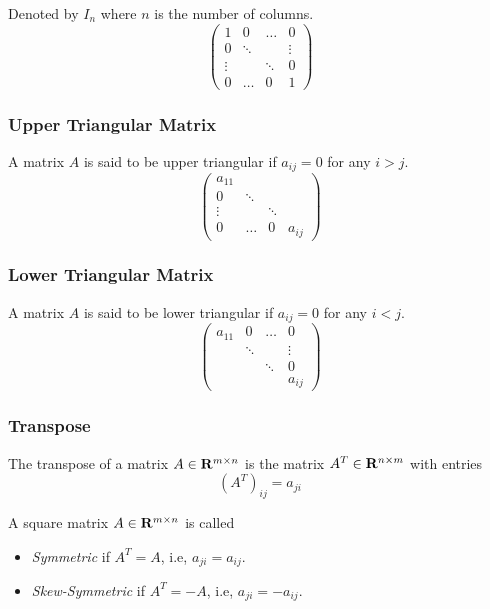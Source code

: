 \documentclass{article}
\begin{document}
	Denoted by $ I_n $ where $ n $ is the number of columns.
	\[
		\begin{pmatrix}
			1      & 0      & \dots  & 0      \\
			0      & \ddots &        & \vdots \\
			\vdots &        & \ddots & 0      \\
			0      & \dots  & 0      & 1
		\end{pmatrix}
	\]
	
	\subsubsection*{Upper Triangular Matrix}
	
	A matrix $ A $ is said to be upper triangular if $ a_{ij} = 0 $ for any $ i>j $.
	\[
		\begin{pmatrix}
			a_{11} &        &        &        \\
			0      & \ddots &        &        \\
			\vdots &        & \ddots &        \\
			0      & \dots  & 0      & a_{ij}
		\end{pmatrix}
	\]
	
	\subsubsection*{Lower Triangular Matrix}
	
	A matrix $ A $ is said to be lower triangular if $ a_{ij} = 0 $ for any $ i<j $.
	\[
		\begin{pmatrix}
			a_{11} & 0      & \dots  & 0      \\
			       & \ddots &        & \vdots \\
			       &        & \ddots & 0      \\
			       &        &        & a_{ij}
		\end{pmatrix}
	\]
	
	\subsubsection*{Transpose}
	
	The transpose of a matrix $ A \in \mathbf{R}^{m \times n} $ is the matrix $ A^T \in \mathbf{R}^{n \times m} $ with entries
	\[
		(A^T)_{ij} = a_{ji}
	\]
	
	A square matrix $ A \in \mathbf{R}^{m \times n} $ is called
	\begin{itemize}
		\item \textit{Symmetric} if $ A^T = A $, i.e, $ a_{ji} = a_{ij} $.
		\item \textit{Skew-Symmetric} if $ A^T = -A $, i.e, $ a_{ji} = -a_{ij} $.
	\end{itemize}
	
\end{document}
